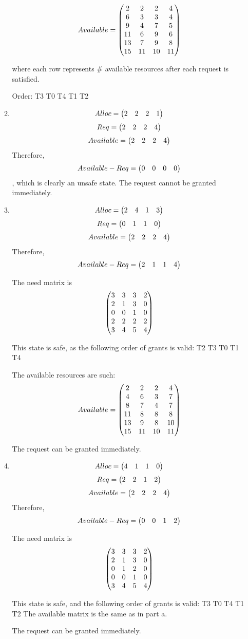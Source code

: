 \documentclass{amsart}
\begin{document}
\begin{enumerate}
\begin{enumerate}
    \[Available = \begin{pmatrix}
        2 & 2 & 2 & 4 \\
        6 & 3 & 3 & 4 \\
        9 & 4 & 7 & 5 \\
        11 & 6 & 9 & 6 \\
        13 & 7 & 9 & 8 \\
        15 & 11 & 10 & 11
    \end{pmatrix}\]

    where each row represents \# available resources after each request is satisfied.

    Order: T3 T0 T4 T1 T2

    \item \[Alloc = \begin{pmatrix}2 & 2 & 2 & 1\end{pmatrix}\]
    \[Req = \begin{pmatrix}2 & 2 & 2 & 4\end{pmatrix}\]
    \[Available = \begin{pmatrix}2 & 2 & 2 & 4\end{pmatrix}\]
    Therefore, \[Available - Req = \begin{pmatrix}0 & 0 & 0 & 0\end{pmatrix}\], which is clearly an unsafe state. The request cannot be granted immediately.

    \item \[Alloc = \begin{pmatrix}2 & 4 & 1 & 3\end{pmatrix}\]
    \[Req = \begin{pmatrix}0 & 1 & 1 & 0\end{pmatrix}\]
    \[Available = \begin{pmatrix}2 & 2 & 2 & 4\end{pmatrix}\]
    Therefore, \[Available - Req = \begin{pmatrix}2 & 1 & 1 & 4\end{pmatrix}\]

    The need matrix is \[\begin{pmatrix}
        3 & 3 & 3 & 2 \\
        2 & 1 & 3 & 0 \\
        0 & 0 & 1 & 0 \\
        2 & 2 & 2 & 2 \\
        3 & 4 & 5 & 4
    \end{pmatrix}\]

    This state is safe, as the following order of grants is valid: T2 T3 T0 T1 T4

    The available resources are such: \[Available = \begin{pmatrix}
        2 & 2 & 2 & 4 \\
        4 & 6 & 3 & 7 \\
        8 & 7 & 4 & 7 \\
        11 & 8 & 8 & 8 \\
        13 & 9 & 8 & 10 \\
        15 & 11 & 10 & 11
    \end{pmatrix}\]

    The request can be granted immediately.

    \item \[Alloc = \begin{pmatrix}4 & 1 & 1 & 0\end{pmatrix}\]
    \[Req = \begin{pmatrix}2 & 2 & 1 & 2\end{pmatrix}\]
    \[Available = \begin{pmatrix}2 & 2 & 2 & 4\end{pmatrix}\]
    Therefore, \[Available - Req = \begin{pmatrix}0 & 0 & 1 & 2\end{pmatrix}\]

    The need matrix is \[\begin{pmatrix}
        3 & 3 & 3 & 2 \\
        2 & 1 & 3 & 0 \\
        0 & 1 & 2 & 0 \\
        0 & 0 & 1 & 0 \\
        3 & 4 & 5 & 4
    \end{pmatrix}\]

    This state is safe, and the following order of grants is valid: T3 T0 T4 T1 T2
    The available matrix is the same as in part a.

    The request can be granted immediately.
    \end{enumerate}
\end{enumerate}
\end{document}
